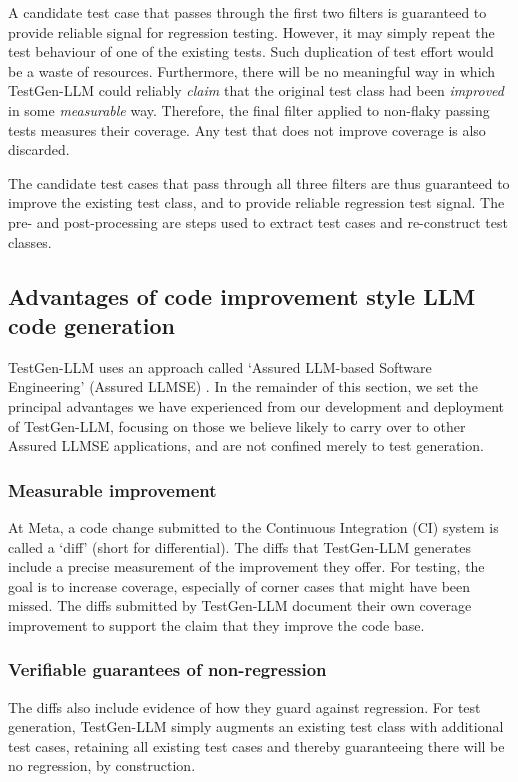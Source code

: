 \documentclass[sigconf,screen]{acmart}
\begin{document}
A candidate test case that passes through the first two filters is guaranteed to provide reliable signal for regression testing. 
However, it may simply repeat  the test behaviour of one of the existing tests. 
Such duplication of test effort would be a waste of resources. 
Furthermore, there will be no meaningful way in which TestGen-LLM could reliably {\em claim} that the original test class had been {\em improved} in some {\em measurable} way.
Therefore, the final filter applied to non-flaky passing tests measures their coverage. 
Any test that does not improve coverage is also discarded.

The candidate test cases that pass through all three filters are thus guaranteed to improve the existing test class, and to provide reliable regression test signal.
The pre- and post-processing are steps used to extract test cases and re-construct test classes.








\subsection{Advantages of code improvement style LLM code generation}



TestGen-LLM uses an approach called `Assured LLM-based Software Engineering' (Assured LLMSE) \cite{mhetal:intense24-keynote}.
In the remainder of this section, we set the principal advantages we have experienced from our development and deployment of TestGen-LLM,
focusing on those we believe likely to  carry over to other Assured LLMSE applications, and are not confined merely to test generation.



\subsubsection{Measurable improvement} 
At Meta, a code change submitted to the Continuous Integration (CI) system  is called a `diff' (short for differential).
The diffs that TestGen-LLM generates include a precise measurement of the improvement they offer. 
For testing, the goal is to increase coverage, especially of corner cases that might have been missed. 
The diffs submitted by TestGen-LLM document their own coverage improvement to support the claim that they improve the code base. 


\subsubsection{Verifiable guarantees of non-regression} 
The diffs also include evidence of how they guard against regression. 
For test generation, TestGen-LLM simply augments an existing test class with additional test cases, retaining all existing test cases and thereby guaranteeing there will be no regression, by construction. 
\end{document}
